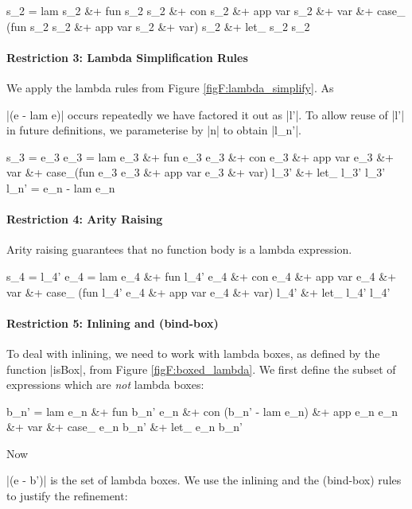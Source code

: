 \ignore\begin{code}
s_2  =  lam s_2 &+ fun s_2 s_2 &+ con s_2 &+ app var s_2 &+ var &+
        case_ (fun s_2 s_2 &+ app var s_2 &+ var) s_2 &+ let_ s_2 s_2
\end{code}

\paragraph{Restriction 3: Lambda Simplification Rules}
We apply the lambda rules from Figure \ref{figF:lambda_simplify}. As \ignore|(e - lam e)| occurs repeatedly we have factored it out as |l'|. To allow reuse of |l'| in future definitions, we parameterise by |n| to obtain |l_n'|.

\ignore\begin{code}
s_3   =  e_3
e_3   =  lam e_3 &+ fun e_3 e_3 &+ con e_3 &+ app var e_3 &+ var &+
         case_(fun e_3 e_3 &+ app var e_3 &+ var) l_3' &+ let_ l_3' l_3'
l_n'  =  e_n - lam e_n
\end{code}

\paragraph{Restriction 4: Arity Raising}
Arity raising guarantees that no function body is a lambda expression.

\ignore\begin{code}
s_4   =  l_4'
e_4   =  lam e_4 &+ fun l_4' e_4 &+ con e_4 &+ app var e_4 &+ var &+
         case_ (fun l_4' e_4 &+ app var e_4 &+ var) l_4' &+ let_ l_4' l_4'
\end{code}

\paragraph{Restriction 5: Inlining and (bind-box)}
To deal with inlining, we need to work with lambda boxes, as defined by the function |isBox|, from Figure \ref{figF:boxed_lambda}. We first define the subset of expressions which are \textit{not} lambda boxes:

\ignore\begin{code}
b_n'  =  lam e_n &+ fun b_n' e_n &+ con (b_n' - lam e_n) &+ app e_n e_n &+ var &+
         case_ e_n b_n' &+ let_ e_n b_n'
\end{code}

Now \ignore|(e - b')| is the set of lambda boxes. We use the inlining and the (bind-box) rules to justify the refinement:

